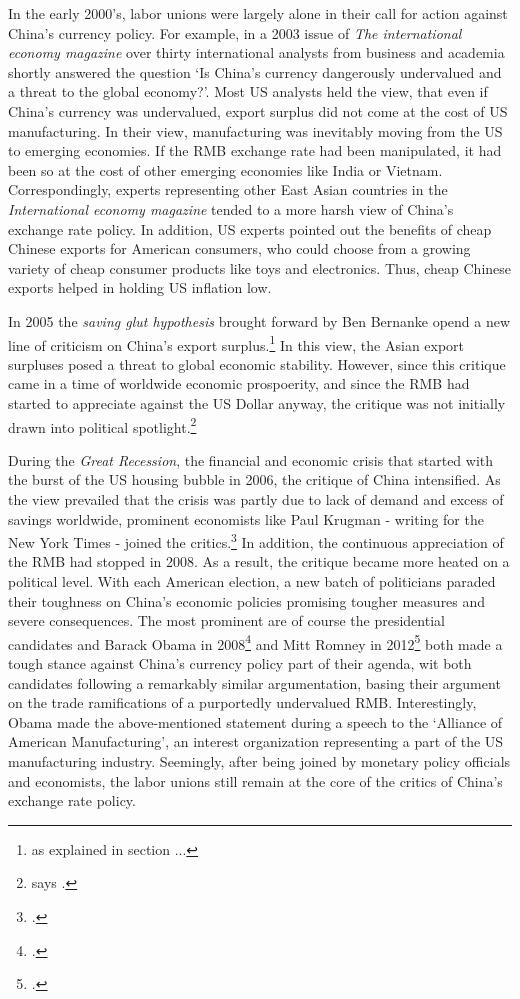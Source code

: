 In the early 2000's, labor unions were largely alone in their call for action against China's currency policy. For example, in a 2003 issue of \emph{The international economy magazine} over thirty international analysts from business and academia shortly answered the question `Is China's currency dangerously undervalued and a threat to the global economy?'.%
Most US analysts held the view, that even if China's currency was undervalued, export surplus did not come at the cost of US manufacturing. In their view, manufacturing was inevitably moving from the US to emerging economies. If the RMB exchange rate had been manipulated, it had been so at the cost of other emerging economies like India or Vietnam. Correspondingly, experts representing other East Asian countries in the \emph{International economy magazine} tended to a more harsh view of China's exchange rate policy. In addition, US experts pointed out the benefits of cheap Chinese exports for American consumers, who could choose from a growing variety of cheap consumer products like toys and electronics. Thus, cheap Chinese exports helped in holding US inflation low.

In 2005 the \emph{saving glut hypothesis} brought forward by Ben Bernanke opend a new line of criticism on China's export surplus.\footnote{as explained in section ...} %
In this view, the Asian export surpluses posed a threat to global economic stability. However, since this critique came in a time of worldwide economic prospoerity, and since the RMB had started to appreciate against the US Dollar anyway, the critique was not initially drawn into political spotlight.\footnote{says \cite[p.16]{Levy2010}.}

During the \emph{Great Recession}, the financial and economic crisis that started with the burst of the US housing bubble in 2006, the critique of China intensified. As the view prevailed that the crisis was partly due to lack of demand and excess of savings worldwide, prominent economists like Paul Krugman - writing for the New York Times - joined the critics.\footnote{\cite{Krugman2009}.} In addition, the continuous appreciation of the RMB had stopped in 2008. As a result, the critique became more heated on a political level. With each American election, a new batch of politicians paraded their 
toughness on China's economic policies promising tougher measures and 
severe consequences. The most prominent are of course the presidential candidates and  Barack Obama in 
2008\footnote{\cite{Obama2008}.} and Mitt Romney in 2012\footnote{\cite{Romney2012}.} both made a tough stance against China's currency policy part of their agenda, wit both candidates following a remarkably similar argumentation, basing their argument on the trade ramifications of a 
purportedly undervalued RMB. Interestingly, Obama made the above-mentioned statement during a speech to the `Alliance of American 
Manufacturing', an interest organization representing a part of the US 
manufacturing industry. Seemingly, after being joined by monetary policy officials and economists, the labor unions still remain at the core of the critics of China's exchange rate policy.


